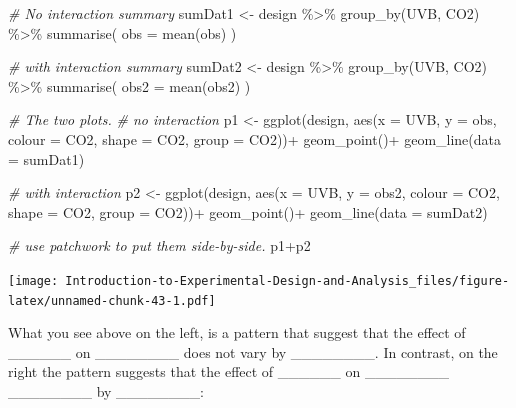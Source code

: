 \documentclass[
]{book}
\newenvironment{Shaded}{\begin{snugshade}}{\end{snugshade}}
\newcommand{\AttributeTok}[1]{\textcolor[rgb]{0.77,0.63,0.00}{#1}}
\newcommand{\CommentTok}[1]{\textcolor[rgb]{0.56,0.35,0.01}{\textit{#1}}}
\newcommand{\FunctionTok}[1]{\textcolor[rgb]{0.00,0.00,0.00}{#1}}
\newcommand{\NormalTok}[1]{#1}
\newcommand{\OtherTok}[1]{\textcolor[rgb]{0.56,0.35,0.01}{#1}}
\newcommand{\SpecialCharTok}[1]{\textcolor[rgb]{0.00,0.00,0.00}{#1}}
\begin{document}
\begin{Shaded}
\begin{Highlighting}[]
\CommentTok{\# No interaction summary}
\NormalTok{sumDat1 }\OtherTok{\textless{}{-}}\NormalTok{ design }\SpecialCharTok{\%\textgreater{}\%} 
  \FunctionTok{group\_by}\NormalTok{(UVB, CO2) }\SpecialCharTok{\%\textgreater{}\%} 
  \FunctionTok{summarise}\NormalTok{(}
    \AttributeTok{obs =} \FunctionTok{mean}\NormalTok{(obs)}
\NormalTok{  )}

\CommentTok{\# with interaction summary}
\NormalTok{sumDat2 }\OtherTok{\textless{}{-}}\NormalTok{ design }\SpecialCharTok{\%\textgreater{}\%} 
  \FunctionTok{group\_by}\NormalTok{(UVB, CO2) }\SpecialCharTok{\%\textgreater{}\%} 
  \FunctionTok{summarise}\NormalTok{(}
    \AttributeTok{obs2 =} \FunctionTok{mean}\NormalTok{(obs2)}
\NormalTok{  )}

\CommentTok{\# The two plots.}
\CommentTok{\# no interaction}
\NormalTok{p1 }\OtherTok{\textless{}{-}} \FunctionTok{ggplot}\NormalTok{(design, }\FunctionTok{aes}\NormalTok{(}\AttributeTok{x =}\NormalTok{ UVB, }\AttributeTok{y =}\NormalTok{ obs, }\AttributeTok{colour =}\NormalTok{ CO2, }\AttributeTok{shape =}\NormalTok{ CO2, }\AttributeTok{group =}\NormalTok{ CO2))}\SpecialCharTok{+}
  \FunctionTok{geom\_point}\NormalTok{()}\SpecialCharTok{+}
  \FunctionTok{geom\_line}\NormalTok{(}\AttributeTok{data =}\NormalTok{ sumDat1)}

\CommentTok{\# with interaction}
\NormalTok{p2 }\OtherTok{\textless{}{-}} \FunctionTok{ggplot}\NormalTok{(design, }\FunctionTok{aes}\NormalTok{(}\AttributeTok{x =}\NormalTok{ UVB, }\AttributeTok{y =}\NormalTok{ obs2, }\AttributeTok{colour =}\NormalTok{ CO2, }\AttributeTok{shape =}\NormalTok{ CO2, }\AttributeTok{group =}\NormalTok{ CO2))}\SpecialCharTok{+}
  \FunctionTok{geom\_point}\NormalTok{()}\SpecialCharTok{+}
  \FunctionTok{geom\_line}\NormalTok{(}\AttributeTok{data =}\NormalTok{ sumDat2)}

\CommentTok{\# use patchwork to put them side{-}by{-}side.}
\NormalTok{p1}\SpecialCharTok{+}\NormalTok{p2}
\end{Highlighting}
\end{Shaded}

\texttt{[image: Introduction-to-Experimental-Design-and-Analysis\_files/figure-latex/unnamed-chunk-43-1.pdf]}

What you see above on the left, is a pattern that suggest that the effect of \_\_\_\_\_\_ on \_\_\_\_\_\_\_\_ does not vary by \_\_\_\_\_\_\_\_. In contrast, on the right the pattern suggests that the effect of \_\_\_\_\_\_ on \_\_\_\_\_\_\_\_ \_\_\_\_\_\_\_\_ by \_\_\_\_\_\_\_\_:
\end{document}
